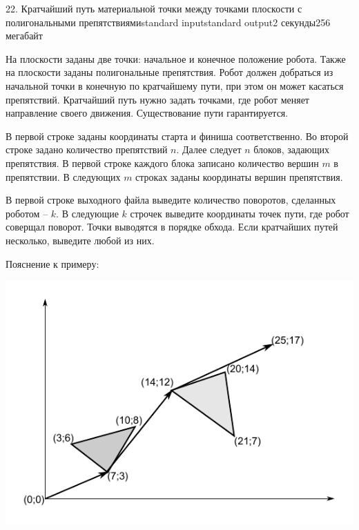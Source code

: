 \begin{problem}{22. Кратчайший путь материальной точки между точками плоскости с полигональными препятствиями}{standard input}{standard output}{2 секунды}{256 мегабайт}

На плоскости заданы две точки: начальное и конечное положение робота. Также на плоскости заданы полигональные препятствия.
Робот должен добраться из начальной точки в конечную по кратчайшему пути, при этом он может касаться препятствий.
Кратчайший путь нужно задать точками, где робот меняет направление своего движения. Существование пути гарантируется.
  
\InputFile
В первой строке заданы координаты старта и финиша соответственно.
Во второй строке задано количество препятствий $n$.
Далее следует $n$ блоков, задающих препятствия.
В первой строке каждого блока записано количество вершин $m$ в препятствии. В следующих $m$ строках заданы координаты вершин препятствия.

\OutputFile

В первой строке выходного файла выведите количество поворотов, сделанных роботом -- $k$.
В следующие $k$ строчек выведите координаты точек пути, где робот соверщал поворот. Точки выводятся в порядке обхода. 
Если кратчайших путей несколько, выведите любой из них.
\Examples

\begin{example}%
%
\end{example}

\Note
Пояснение к примеру:
\begin{center}
	\includegraphics{example.pdf}
\end{center}
\end{problem}